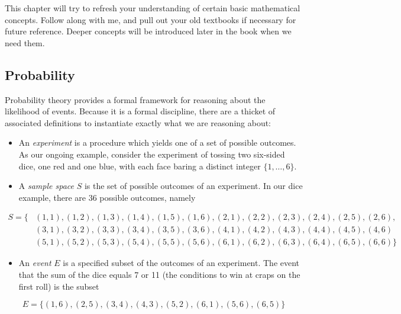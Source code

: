 \documentclass[10pt]{article}
\begin{document}
This chapter will try to refresh your understanding of certain basic mathematical concepts. Follow along with me, and pull out your old textbooks if necessary for future reference. Deeper concepts will be introduced later in the book when we need them.

\subsection*{Probability}

Probability theory provides a formal framework for reasoning about the likelihood of events. Because it is a formal discipline, there are a thicket of associated definitions to instantiate exactly what we are reasoning about:

\begin{itemize}
    \item An \textit{experiment} is a procedure which yields one of a set of possible outcomes. As our ongoing example, consider the experiment of tossing two six-sided dice, one red and one blue, with each face baring a distinct integer \(\{1, \ldots, 6\}\).
    
    \item A \textit{sample space} \(S\) is the set of possible outcomes of an experiment. In our dice example, there are 36 possible outcomes, namely
\end{itemize}

\begin{align*}
    S = \{ & (1,1),(1,2),(1,3),(1,4),(1,5),(1,6),(2,1),(2,2),(2,3),(2,4),(2,5),(2,6), \\
           & (3,1),(3,2),(3,3),(3,4),(3,5),(3,6),(4,1),(4,2),(4,3),(4,4),(4,5),(4,6) \\
           & (5,1),(5,2),(5,3),(5,4),(5,5),(5,6),(6,1),(6,2),(6,3),(6,4),(6,5),(6,6)\} 
\end{align*}

\begin{itemize}
    \item An \textit{event} \(E\) is a specified subset of the outcomes of an experiment. The event that the sum of the dice equals 7 or 11 (the conditions to win at craps on the first roll) is the subset
\end{itemize}

\[ E = \{(1,6),(2,5),(3,4),(4,3),(5,2),(6,1),(5,6),(6,5)\} \]
\end{document}
